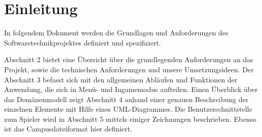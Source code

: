 \chapter{Einleitung}
In folgendem Dokument werden die Grundlagen und Anforderungen des Softwaretechnikprojektes definiert und 
spezifiziert. 

Abschnitt 2 bietet eine Übersicht über die grundlegenden Anforderungen an das Projekt, sowie die technischen 
Anforderungen und unsere Umsetzungsideen. Der Abschnitt 3 befasst sich mit den allgemeinen Abläufen und 
Funktionen der Anwendung, die sich in Menü- und Ingamemodus aufteilen. Einen Überblick über das Domänenmodell 
zeigt Abschnitt 4 anhand einer genauen Beschreibung der einzelnen Elemente mit Hilfe eines UML-Diagrammes. 
Die Benutzerschnittstelle zum Spieler wird in Abschnitt 5 mittels einiger Zeichnungen beschrieben. Ebenso 
ist das Campusdateiformat hier definiert.


